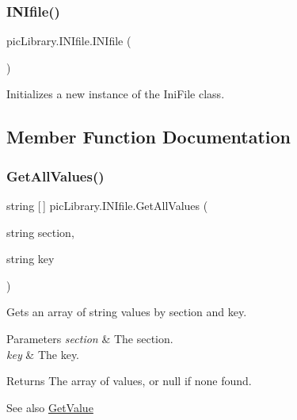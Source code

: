 \subsubsection{\texorpdfstring{INIfile()}{INIfile()}\hspace{0.1cm}{\footnotesize\ttfamily [2/2]}}
{\footnotesize\ttfamily pic\+Library.\+I\+N\+Ifile.\+I\+N\+Ifile (\begin{DoxyParamCaption}{ }\end{DoxyParamCaption})\hspace{0.3cm}{\ttfamily [inline]}}



Initializes a new instance of the Ini\+File class. 



\subsection{Member Function Documentation}
\mbox{\label{classpic_library_1_1_i_n_ifile_a841f8111aed3cef3de338c393d8e0ee5}} 
\subsubsection{\texorpdfstring{GetAllValues()}{GetAllValues()}}
{\footnotesize\ttfamily string \mbox{[}$\,$\mbox{]} pic\+Library.\+I\+N\+Ifile.\+Get\+All\+Values (\begin{DoxyParamCaption}\item[{string}]{section,  }\item[{string}]{key }\end{DoxyParamCaption})\hspace{0.3cm}{\ttfamily [inline]}}



Gets an array of string values by section and key. 


\begin{DoxyParams}{Parameters}
{\em section} & The section.\\
\hline
{\em key} & The key.\\
\hline
\end{DoxyParams}
\begin{DoxyReturn}{Returns}
The array of values, or null if none found.
\end{DoxyReturn}
\begin{DoxySeeAlso}{See also}
\mbox{\hyperlink{classpic_library_1_1_i_n_ifile_a3af503f215c3c270458847c7f6733da5}{Get\+Value}}


\end{DoxySeeAlso}
\mbox{\label{classpic_library_1_1_i_n_ifile_acec60d423b48f84c12b0e07259a00549}} 

